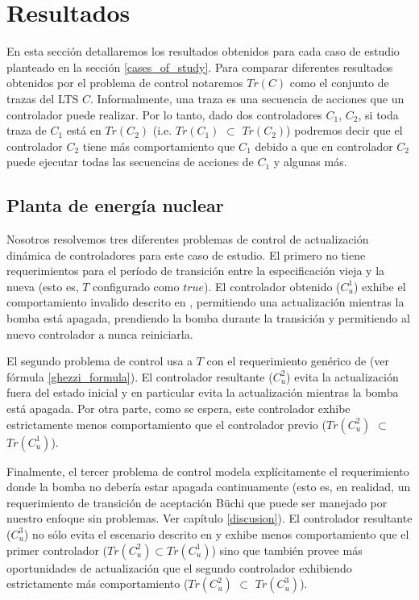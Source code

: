 \section{Resultados}

En esta sección detallaremos los resultados obtenidos para cada caso de estudio planteado en la sección
\ref{cases_of_study}. Para comparar diferentes resultados obtenidos por el problema de control notaremos $Tr(C)$ como el
conjunto de trazas del LTS $C$. Informalmente, una traza es una secuencia de acciones que un controlador puede
realizar. Por lo tanto, dado dos controladores $C_1$, $C_2$, si toda traza de $C_1$ está en $Tr(C_2)$ (i.e. $Tr(C_1)$
$\subset$ $Tr(C_2)$) podremos decir que el controlador $C_2$ tiene más comportamiento que $C_1$ debido a que en controlador
$C_2$ puede ejecutar todas las secuencias de acciones de $C_1$ y algunas más.

\subsection{Planta de energía nuclear}

Nosotros resolvemos tres diferentes problemas de control de actualización dinámica de controladores para este caso de
estudio. El primero no tiene requerimientos para el período de transición entre la especificación vieja y la nueva (esto
es, $T$ configurado como $true$). El controlador obtenido ($C^1_u$) exhibe el comportamiento invalido descrito en
\cite{PanzicaLaManna:2013:FCC:2487336.2487349}, permitiendo una actualización mientras la bomba está apagada, prendiendo
la bomba durante la transición y permitiendo al nuevo controlador a nunca reiniciarla.

El segundo problema de control usa a $T$ con el requerimiento genérico de \cite{6224401} (ver fórmula
\ref{ghezzi_formula}). El controlador resultante ($C_u^{2}$) evita la actualización fuera del estado inicial y en
particular evita la actualización mientras la bomba está apagada. Por otra parte, como se espera, este controlador exhibe
estrictamente menos comportamiento que el controlador previo ($Tr(C^2_u)$ $\subset$ $Tr(C^1_u)$).

Finalmente, el tercer problema de control modela explícitamente el requerimiento donde la bomba no debería estar
apagada continuamente (esto es, en realidad, un requerimiento de transición de aceptación Büchi que puede ser manejado
por nuestro enfoque sin problemas. Ver capítulo \ref{discusion}). El controlador resultante ($C^3_u$) no sólo evita el
escenario descrito en \cite{PanzicaLaManna:2013:FCC:2487336.2487349} y exhibe menos comportamiento que el primer
controlador ($Tr(C^2_u) \subset Tr(C^1_u)$) sino que también provee más oportunidades de actualización que el segundo
controlador exhibiendo estrictamente más comportamiento ($Tr(C^2_u)$ $\subset$ $Tr(C^3_u)$). 

